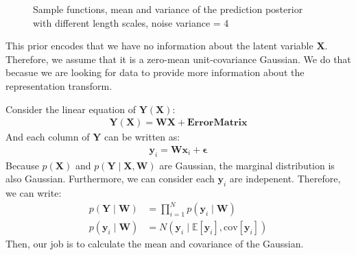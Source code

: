 \documentclass[12pt]{article}
\newenvironment{question}[2][Question]{\begin{trivlist}
\kern10pt
\item[\hskip \labelsep {\bfseries #1}\hskip \labelsep {\bfseries #2.}]}{\end{trivlist}}
\begin{document}
\begin{question}{11}
\begin{figure}[h!]
{  }
  \caption{Sample functions, mean and variance of the prediction posterior with 
           different length scales, noise variance = 4}
  \label{fig:Q11-predict-post-noise4}
\end{figure}


\end{question}

\begin{question}{12}
This prior encodes that we have no information about the latent variable $\mathbf{X}$.
Therefore, we assume that it is a zero-mean unit-covariance Gaussian. We do that becasue
we are looking for data to provide more information about the representation transform.
\end{question}

\begin{question}{13}
Consider the linear equation of $\mathbf{Y}(\mathbf{X})$:
  \begin{align*}
    \mathbf{Y}(\mathbf{X}) = \mathbf{W}\mathbf{X} + \bm{ErrorMatrix}
  \end{align*}
And each column of $\mathbf{Y}$ can be written as:
\begin{align*}
  \mathbf{y}_i = \mathbf{W}\mathbf{x}_i + \bm{\epsilon}
\end{align*}
Because $p(\mathbf{X})$ and $p(\mathbf{Y}\mid\mathbf{X}, \mathbf{W})$ are Gaussian, 
 the marginal distribution is also Gaussian.
 Furthermore, we can consider each $\mathbf{y}_i$ are indepenent. Therefore, 
 we can write:
\begin{align*}
  p(\mathbf{Y}\mid\mathbf{W}) &= \prod_{i=1}^{N} p(\mathbf{y}_i\mid\mathbf{W}) \\
  p(\mathbf{y}_i\mid\mathbf{W}) &= N(\mathbf{y}_i\mid \mathbb{E}[\mathbf{y}_i], \text{cov}[\mathbf{y}_i])
\end{align*}
Then, our job is to calculate the mean and covariance of the Gaussian.


\end{question}
\end{document}
